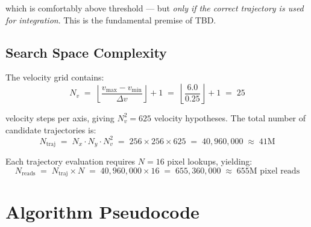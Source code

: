 \documentclass[11pt,letterpaper]{article}
\begin{document}
\noindent which is comfortably above threshold --- but \emph{only if the
correct trajectory is used for integration}. This is the fundamental
premise of TBD.

\subsection{Search Space Complexity}

The velocity grid contains:
\begin{equation}
    N_v \;=\; \left\lfloor \frac{v_{\max} - v_{\min}}{\Delta v} \right\rfloor + 1
    \;=\; \left\lfloor \frac{6.0}{0.25} \right\rfloor + 1
    \;=\; 25
\end{equation}

\noindent velocity steps per axis, giving $N_v^2 = 625$ velocity hypotheses.
The total number of candidate trajectories is:
\begin{equation}
    N_{\mathrm{traj}}
    \;=\; N_x \cdot N_y \cdot N_v^2
    \;=\; 256 \times 256 \times 625
    \;=\; 40{,}960{,}000
    \;\approx\; 41\text{M}
\end{equation}

Each trajectory evaluation requires $N = 16$ pixel lookups, yielding:
\begin{equation}
    N_{\mathrm{reads}}
    \;=\; N_{\mathrm{traj}} \times N
    \;=\; 40{,}960{,}000 \times 16
    \;=\; 655{,}360{,}000
    \;\approx\; 655\text{M pixel reads}
\end{equation}

\section{Algorithm Pseudocode}
\label{sec:algorithm}
\end{document}
